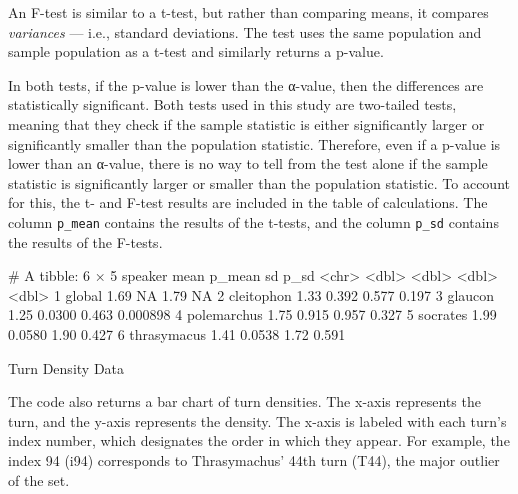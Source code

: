 \documentclass[noraggedright]{turabian-researchpaper}
\begin{document}
An F-test is similar to a t-test, but rather than comparing means, it compares \emph{variances} — i.e., standard deviations. The test uses the same population and sample population as a t-test and similarly returns a p-value. 

In both tests, if the p-value is lower than the α-value, then the differences are statistically significant. Both tests used in this study are two-tailed tests, meaning that they check if the sample statistic is either significantly larger or significantly smaller than the population statistic. Therefore, even if a p-value is lower than an α-value, there is no way to tell from the test alone if the sample statistic is significantly larger or smaller than the population statistic. To account for this, the t- and F-test results are included in the table of calculations. The column \texttt{p\_mean} contains the results of the t-tests, and the column \texttt{p\_sd} contains the results of the F-tests.

\begin{table}[htbp]
\begin{Schunk}
\begin{Soutput}
# A tibble: 6 × 5
  speaker      mean  p_mean    sd      p_sd
  <chr>       <dbl>   <dbl> <dbl>     <dbl>
1 global       1.69 NA      1.79  NA       
2 cleitophon   1.33  0.392  0.577  0.197   
3 glaucon      1.25  0.0300 0.463  0.000898
4 polemarchus  1.75  0.915  0.957  0.327   
5 socrates     1.99  0.0580 1.90   0.427   
6 thrasymacus  1.41  0.0538 1.72   0.591   
\end{Soutput}
\end{Schunk}
\caption{Turn Density Data}
\label{tab:DensityData}
\end{table}

The code also returns a bar chart of turn densities. The x-axis represents the turn, and the y-axis represents the density. The x-axis is labeled with each turn's index number, which designates the order in which they appear. For example, the index 94 (i94) corresponds to Thrasymachus' 44th turn (T44), the major outlier of the set.
\end{document}
